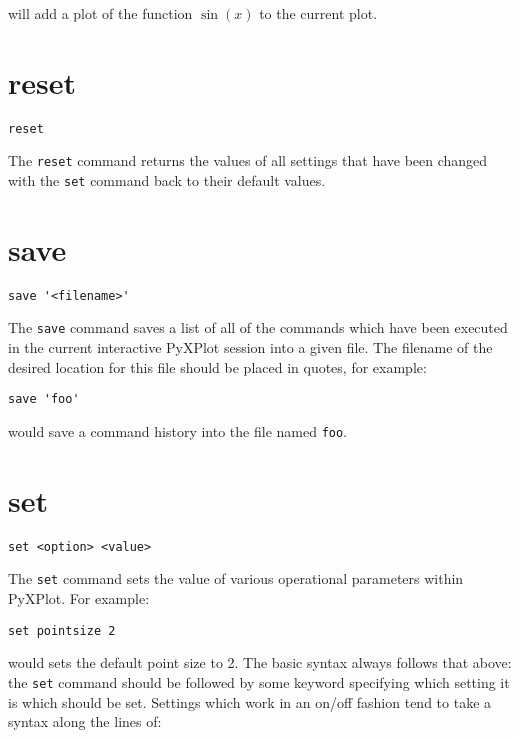 \noindent will add a plot of the function $\sin(x)$ to the current plot.


\section{reset}

\begin{verbatim}
reset
\end{verbatim}

The {\tt reset} command returns the values of all settings that have been
changed with the {\tt set} command back to their default values.


\section{save}

\begin{verbatim}
save '<filename>'
\end{verbatim}

The {\tt save} command saves a list of all of the commands which have been
executed in the current interactive PyXPlot session into a given file. The
filename of the desired location for this file should be placed in quotes, for
example:

\begin{verbatim}
save 'foo'
\end{verbatim}

\noindent would save a command history into the file named {\tt foo}.


\section{set}

\begin{verbatim}
set <option> <value>
\end{verbatim}

The {\tt set} command sets the value of various operational parameters within
PyXPlot.  For example:

\begin{verbatim}
set pointsize 2
\end{verbatim}

\noindent would sets the default point size to 2. The basic syntax always
follows that above: the {\tt set} command should be followed by some keyword
specifying which setting it is which should be set.  Settings which work in an
on/off fashion tend to take a syntax along the lines of:

